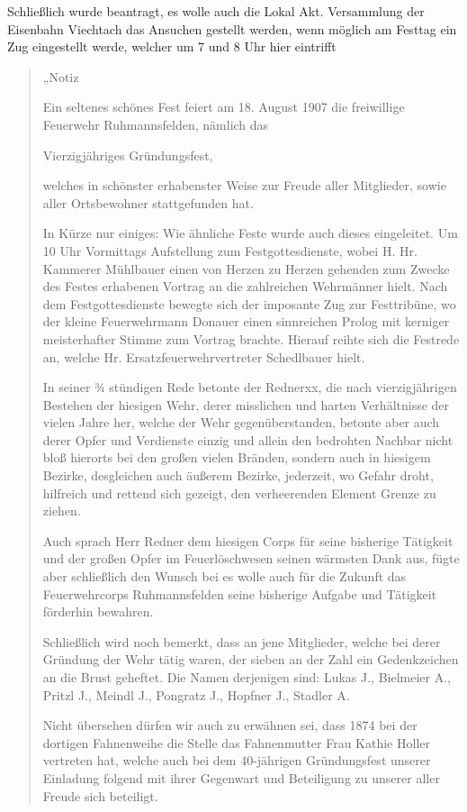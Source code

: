 \documentclass[12pt,a4paper]{book}
\begin{document}
\begin{itemize}
Schließlich wurde beantragt, es wolle auch die Lokal Akt. Versammlung der
Eisenbahn Viechtach das Ansuchen gestellt werden, wenn möglich am Festtag ein
Zug eingestellt werde, welcher um 7 und 8 Uhr hier eintrifft

\begin{quote}
„Notiz

Ein seltenes schönes Fest feiert am 18. August 1907 die freiwillige Feuerwehr
Ruhmannsfelden, nämlich das

Vierzigjähriges Gründungsfest,

welches in schönster erhabenster Weise zur Freude aller Mitglieder, sowie aller
Ortsbewohner stattgefunden hat.

In Kürze nur einiges: Wie ähnliche Feste wurde auch dieses eingeleitet. Um 10
Uhr Vormittags Aufstellung zum Festgottesdienste, wobei H. Hr. Kammerer
Mühlbauer einen von Herzen zu Herzen gehenden zum Zwecke des Festes erhabenen
Vortrag an die zahlreichen Wehrmänner hielt. Nach dem Festgottesdienste bewegte
sich der imposante Zug zur Festtribüne, wo der kleine Feuerwehrmann Donauer
einen sinnreichen Prolog mit kerniger meisterhafter Stimme zum Vortrag brachte.
Hierauf reihte sich die Festrede an, welche Hr. Ersatzfeuerwehrvertreter
Schedlbauer hielt.

In seiner ¾ stündigen Rede betonte der Rednerxx, die nach vierzigjährigen
Bestehen der hiesigen Wehr, derer misslichen und harten Verhältnisse der vielen
Jahre her, welche der Wehr gegenüberstanden, betonte aber auch derer Opfer und
Verdienste einzig und allein den bedrohten Nachbar nicht bloß hierorts bei den
großen vielen Bränden, sondern auch in hiesigem Bezirke, desgleichen auch
äußerem Bezirke, jederzeit, wo Gefahr droht, hilfreich und rettend sich gezeigt,
den verheerenden Element Grenze zu ziehen.

Auch sprach Herr Redner dem hiesigen Corps für seine bisherige Tätigkeit und der
großen Opfer im Feuerlöschwesen seinen wärmsten Dank aus, fügte aber schließlich
den Wunsch bei es wolle auch für die Zukunft das Feuerwehrcorps Ruhmannsfelden
seine bisherige Aufgabe und Tätigkeit förderhin bewahren.

Schließlich wird noch bemerkt, dass an jene Mitglieder, welche bei derer
Gründung der Wehr tätig waren, der sieben an der Zahl ein Gedenkzeichen an die
Brust geheftet. Die Namen derjenigen sind: Lukas J., Bielmeier A., Pritzl J.,
Meindl J., Pongratz J., Hopfner J., Stadler A.

Nicht übersehen dürfen wir auch zu erwähnen sei, dass 1874 bei der dortigen
Fahnenweihe die Stelle das Fahnenmutter Frau Kathie Holler vertreten hat, welche
auch bei dem 40-jährigen Gründungsfest unserer Einladung folgend mit ihrer
Gegenwart und Beteiligung zu unserer aller Freude sich beteiligt.


\end{quote}
\end{itemize}
\end{document}
